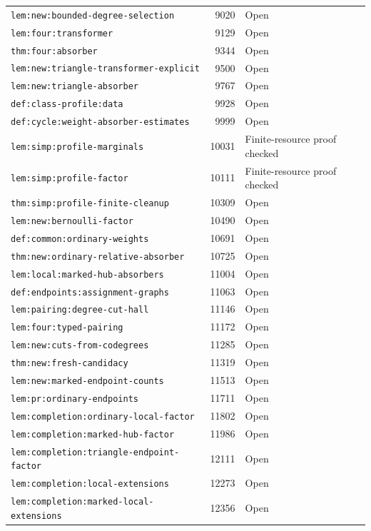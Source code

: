 \begin{longtable}{p{}r >{\raggedright\arraybackslash}p{}}
\nolinkurl{lem:new:bounded-degree-selection} & 9020 & Open \\
\nolinkurl{lem:four:transformer} & 9129 & Open \\
\nolinkurl{thm:four:absorber} & 9344 & Open \\
\nolinkurl{lem:new:triangle-transformer-explicit} & 9500 & Open \\
\nolinkurl{lem:new:triangle-absorber} & 9767 & Open \\
\nolinkurl{def:class-profile:data} & 9928 & Open \\
\nolinkurl{def:cycle:weight-absorber-estimates} & 9999 & Open \\
\nolinkurl{lem:simp:profile-marginals} & 10031 & Finite-resource proof checked \\
\nolinkurl{lem:simp:profile-factor} & 10111 & Finite-resource proof checked \\
\nolinkurl{thm:simp:profile-finite-cleanup} & 10309 & Open \\
\nolinkurl{lem:new:bernoulli-factor} & 10490 & Open \\
\nolinkurl{def:common:ordinary-weights} & 10691 & Open \\
\nolinkurl{thm:new:ordinary-relative-absorber} & 10725 & Open \\
\nolinkurl{lem:local:marked-hub-absorbers} & 11004 & Open \\
\nolinkurl{def:endpoints:assignment-graphs} & 11063 & Open \\
\nolinkurl{lem:pairing:degree-cut-hall} & 11146 & Open \\
\nolinkurl{lem:four:typed-pairing} & 11172 & Open \\
\nolinkurl{lem:new:cuts-from-codegrees} & 11285 & Open \\
\nolinkurl{thm:new:fresh-candidacy} & 11319 & Open \\
\nolinkurl{lem:new:marked-endpoint-counts} & 11513 & Open \\
\nolinkurl{lem:pr:ordinary-endpoints} & 11711 & Open \\
\nolinkurl{lem:completion:ordinary-local-factor} & 11802 & Open \\
\nolinkurl{lem:completion:marked-hub-factor} & 11986 & Open \\
\nolinkurl{lem:completion:triangle-endpoint-factor} & 12111 & Open \\
\nolinkurl{lem:completion:local-extensions} & 12273 & Open \\
\nolinkurl{lem:completion:marked-local-extensions} & 12356 & Open \\

\end{longtable}
